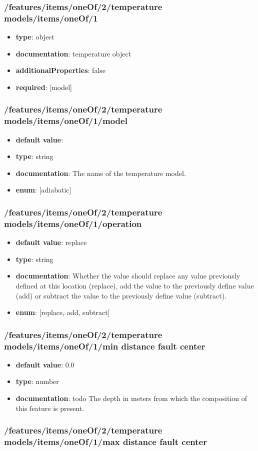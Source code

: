 \subsubsection{/features/items/oneOf/2/temperature models/items/oneOf/1}
\begin{itemize}\item {\bf type}: object
\item {\bf documentation}: temperature object
\item {\bf additionalProperties}: false
\item {\bf required}: [model]\end{itemize}
\subsubsection{/features/items/oneOf/2/temperature models/items/oneOf/1/model}
\begin{itemize}\item {\bf default value}: 
\item {\bf type}: string
\item {\bf documentation}: The name of the temperature model.
\item {\bf enum}: [adiabatic]\end{itemize}\subsubsection{/features/items/oneOf/2/temperature models/items/oneOf/1/operation}
\begin{itemize}\item {\bf default value}: replace
\item {\bf type}: string
\item {\bf documentation}: Whether the value should replace any value previously defined at this location (replace), add the value to the previously define value (add) or subtract the value to the previously define value (subtract).
\item {\bf enum}: [replace, add, subtract]\end{itemize}\subsubsection{/features/items/oneOf/2/temperature models/items/oneOf/1/min distance fault center}
\begin{itemize}\item {\bf default value}: 0.0
\item {\bf type}: number
\item {\bf documentation}: todo The depth in meters from which the composition of this feature is present.
\end{itemize}\subsubsection{/features/items/oneOf/2/temperature models/items/oneOf/1/max distance fault center}
